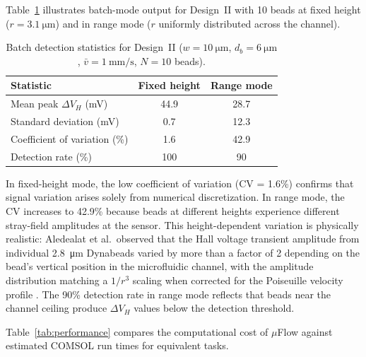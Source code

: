 \documentclass[preprint,review,12pt]{elsarticle}
\begin{document}
Table~\ref{tab:batch} illustrates batch-mode output for Design~II with 10 beads at fixed height ($r = \SI{3.1}{\micro\meter}$) and in range mode ($r$ uniformly distributed across the channel).

\begin{table}[!htbp]
\caption{Batch detection statistics for Design~II ($w = \SI{10}{\micro\meter}$, $d_b = \SI{6}{\micro\meter}$, $\bar{v} = \SI{1}{\milli\meter\per\second}$, $N = 10$ beads).}
\label{tab:batch}
\centering
\small
\begin{tabular}{lcc}
\toprule
Statistic & Fixed height & Range mode \\
\midrule
Mean peak $\Delta V_H$ (\si{\milli\volt}) & 44.9 & 28.7 \\
Standard deviation (\si{\milli\volt}) & 0.7 & 12.3 \\
Coefficient of variation (\%) & 1.6 & 42.9 \\
Detection rate (\%) & 100 & 90 \\
\bottomrule
\end{tabular}
\end{table}

In fixed-height mode, the low coefficient of variation (CV = 1.6\%) confirms that signal variation arises solely from numerical discretization. In range mode, the CV increases to 42.9\% because beads at different heights experience different stray-field amplitudes at the sensor. This height-dependent variation is physically realistic: Aledealat et al.\ observed that the Hall voltage transient amplitude from individual \SI{2.8}{\micro\meter} Dynabeads varied by more than a factor of 2 depending on the bead's vertical position in the microfluidic channel, with the amplitude distribution matching a $1/r^3$ scaling when corrected for the Poiseuille velocity profile \cite{aledealat2009}. The 90\% detection rate in range mode reflects that beads near the channel ceiling produce $\Delta V_H$ values below the detection threshold.


Table~\ref{tab:performance} compares the computational cost of $\mu$Flow against estimated COMSOL run times for equivalent tasks.
\end{document}
